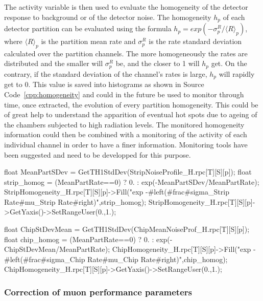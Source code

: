 	The activity variable is then used to evaluate the homogeneity of the detector response to background or of the detector noise. The homogeneity $h_p$ of each detector partition can be evaluated using the formula $h_p = exp(-\sigma^{R}_p/\langle R\rangle_p)$, where $\langle R\rangle_p$ is the partition mean rate and $\sigma^{R}_p$ is the rate standard deviation calculated over the partition channels. The more homogeneously the rates are distributed and the smaller will $\sigma^{R}_p$ be, and the closer to 1 will $h_p$ get. On the contrary, if the standard deviation of the channel's rates is large, $h_p$ will rapidly get to 0. This value is saved into histograms as shown in Source Code~\ref{cpp:homogeneity} and could in the future be used to monitor through time, once extracted, the evolution of every partition homogeneity. This could be of great help to understand the apparition of eventual hot spots due to ageing of the chambers subjected to high radiation levels. The monitored homogeneity information could then be combined with a monitoring of the activity of each individual channel in order to have a finer information. Monitoring tools have been suggested and need to be developped for this purpose.\\
	
	\begin{code}
	\begin{cppcode}
float MeanPartSDev = GetTH1StdDev(StripNoiseProfile_H.rpc[T][S][p]);
float strip_homog = (MeanPartRate==0)
	? 0.
	: exp(-MeanPartSDev/MeanPartRate);
StripHomogeneity_H.rpc[T][S][p]->Fill("exp -#left(#frac{#sigma_{Strip Rate}}{#mu_{Strip Rate}}#right)",strip_homog);
StripHomogeneity_H.rpc[T][S][p]->GetYaxis()->SetRangeUser(0.,1.);

float ChipStDevMean = GetTH1StdDev(ChipMeanNoiseProf_H.rpc[T][S][p]);
float chip_homog = (MeanPartRate==0)
	? 0.
	: exp(-ChipStDevMean/MeanPartRate);
ChipHomogeneity_H.rpc[T][S][p]->Fill("exp -#left(#frac{#sigma_{Chip Rate}}{#mu_{Chip Rate}}#right)",chip_homog);
ChipHomogeneity_H.rpc[T][S][p]->GetYaxis()->SetRangeUser(0.,1.);
	\end{cppcode}
	\label{cpp:homogeneity}
	\vspace{5mm}
	\end{code}
	
		\subsubsection{Correction of muon performance parameters}
		\label{app2:sssec:effcorr}
		
